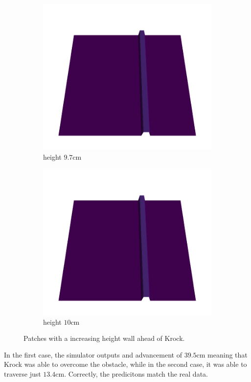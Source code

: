\documentclass[../document.tex]{subfiles}
\begin{document}
\begin{figure}[H]
\begin{subfigure}[b]{0.33\textwidth}
    \end{subfigure}   
    \begin{subfigure}[b]{0.33\textwidth}
        \includegraphics[width=\linewidth]{../img/5/custom_patches/walls_increasing/wall-height-1-3d.png}
    \caption{height $9.7$cm}
    \end{subfigure}   
    \begin{subfigure}[b]{0.33\textwidth}
        \includegraphics[width=\linewidth]{../img/5/custom_patches/walls_increasing/wall-height-2-3d}
        \caption{height $10$cm}
    \end{subfigure}   
\caption{Patches with a increasing height wall ahead of Krock.}    
\end{figure}
In the first case, the simulator outputs and advancement of $39.5$cm meaning that Krock was able to overcome the obstacle, while in the second case, it was able to traverse just $13.4$cm. Correctly, the predicitons match the real data.
\end{document}
